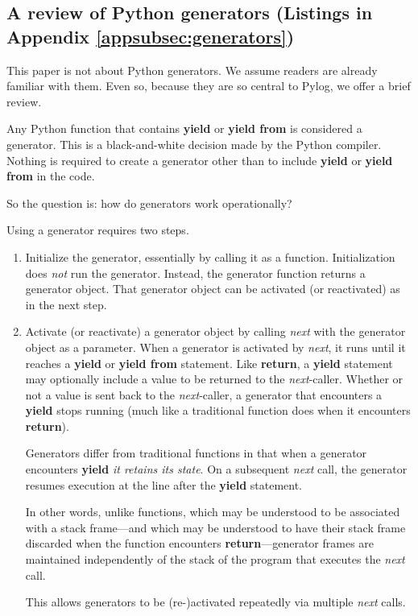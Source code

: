 \subsection{A review of Python generators (Listings in Appendix \ref{appsubsec:generators})} \label{subsec:generators}

This paper is not about Python generators. We assume readers are already familiar with them. Even so, because they are so central to Pylog, we offer a brief review.

\largev
Any Python function that contains \textbf{yield} or \textbf{yield from} is considered a generator. This is a black-and-white decision made by the Python compiler. Nothing is required to create a generator other than to include \textbf{yield} or \textbf{yield from} in the code.

So the question is: how do generators work operationally?

Using a generator requires two steps.
\begin{enumerate}
    \item Initialize the generator, essentially by calling it as a function. Initialization does \textit{not} run the generator. Instead, the generator function returns a generator object. That generator object can be activated (or reactivated) as in the next step.
    
    \item Activate (or reactivate) a generator object by calling \textit{next} with the generator object as a parameter. When a generator is activated by \textit{next}, it runs until it reaches a \textbf{yield} or \textbf{yield from} statement. Like \textbf{return}, a \textbf{yield} statement may optionally include a value to be returned to the \textit{next}-caller. Whether or not a value is sent back to the \textit{next}-caller, a generator that encounters a \textbf{yield} stops running (much like a traditional function does when it encounters \textbf{return}). 
    
    \smallv
    Generators differ from traditional functions in that when a generator encounters \textbf{yield} \textit{it retains its state}. On a subsequent \textit{next} call, the generator resumes execution at the line after the \textbf{yield} statement.
    
    \smallv
    In other words, unlike functions, which may be understood to be associated with a stack frame---and which may be understood to have their stack frame discarded when the function encounters \textbf{return}---generator frames are maintained independently of the stack of the program that executes the \textit{next} call.
    
    \smallv
    This allows generators to be (re-)activated repeatedly via multiple \textit{next} calls.
\end{enumerate}
        

